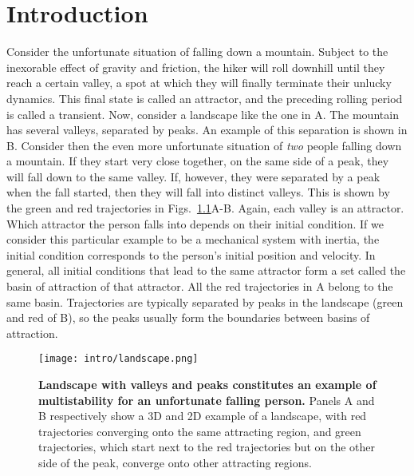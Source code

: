 \chapter{Introduction}
Consider the unfortunate situation of falling down a mountain. Subject to the inexorable effect of gravity and friction, the hiker will roll downhill until they reach a certain valley, a spot at which they will finally terminate their unlucky dynamics. This final state is called an attractor, and the preceding rolling period is called a transient. Now, consider a landscape like the one in A. The mountain has several valleys, separated by peaks. An example of this separation is shown in B. Consider then the even more unfortunate situation of \textit{two} people falling down a mountain. If they start very close together, on the same side of a peak, they will fall down to the same valley. If, however, they were separated by a peak when the fall started, then they will fall into distinct valleys. This is shown by the green and red trajectories in Figs.~\ref{fig:intro:landscape}A-B. Again, each valley is an attractor. Which attractor the person falls into depends on their initial condition. If we consider this particular example to be a mechanical system with inertia, the initial condition corresponds to the person's initial position and velocity. In general, all initial conditions that lead to the same attractor form a set called the basin of attraction of that attractor. All the red trajectories in A belong to the same basin. Trajectories are typically separated by peaks in the landscape (green and red of B), so the peaks usually form the boundaries between basins of attraction.
%
\begin{figure}[htb!]
    \centering
    \texttt{[image: intro/landscape.png]}
    \caption{\textbf{Landscape with valleys and peaks constitutes an example of multistability for an unfortunate falling person.} Panels A and B respectively show a 3D and 2D example of a landscape, with red trajectories converging onto the same attracting region, and green trajectories, which start next to the red trajectories but on the other side of the peak, converge onto other attracting regions.}
    \label{fig:intro:landscape}
\end{figure}

